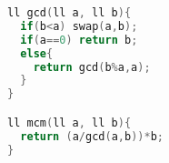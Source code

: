 \begin{lstlisting}[language=C++]
ll gcd(ll a, ll b){
  if(b<a) swap(a,b);
  if(a==0) return b;
  else{
    return gcd(b%a,a);
  }
}

ll mcm(ll a, ll b){
  return (a/gcd(a,b))*b;
}
\end{lstlisting}
